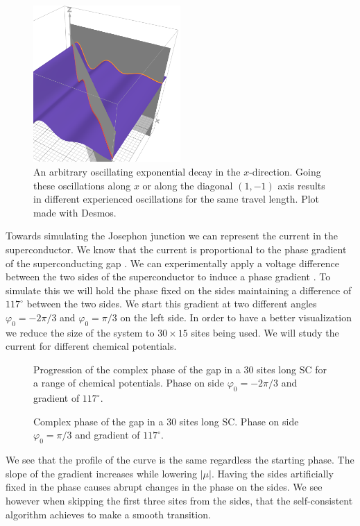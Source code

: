 \documentclass[..\main.tex]{subfile}
\begin{document}
\begin{figure}[H]
  \centering
  \includegraphics[width=0.5\textwidth]{Ressources/CooperPairsOrient.PNG}
  \caption{An arbitrary oscillating exponential decay in the $x$-direction. Going these oscillations along $x$ or along the diagonal $(1,-1)$ axis results in different
  experienced oscillations for the same travel length. Plot made with Desmos.}
\end{figure}
Towards simulating the Josephon junction we can represent the current in the superconductor.
We know that the current is proportional to the phase gradient of the superconducting gap \cite{Orlando2003}.
We can experimentally apply a voltage difference between the two sides of the superconductor to induce a phase gradient \cite{Orlando2003}.
To simulate this we will hold the phase fixed on the sides maintaining a difference of $117^{\circ}$ between the two sides.
We start this gradient at two different angles $\varphi_0 = -2\pi/3$ and $\varphi_0 = \pi/3$ on the left side.
In order to have a better visualization we reduce the size of the system to $30\times15$ sites being used.
 We will study the current for different chemical potentials.
\begin{figure}[H]
    
    \caption{Progression of the complex phase of the gap in a 30 sites long SC for a range of chemical potentials.
     Phase on side $\varphi_0 = -2\pi/3$ and gradient of $117^{\circ}$.}
    \label{fig:Phase-2pi3}
\end{figure}
\begin{figure}[H]
    
    \caption{Complex phase of the gap in a 30 sites long SC. Phase on side $\varphi_0 = \pi/3$ and gradient of $117^{\circ}$.}
    \label{fig:Phasepi3}
\end{figure}
We see that the profile of the curve is the same regardless the starting phase. The slope of the gradient increases while lowering $|\mu|$.
Having the sides artificially fixed in the phase causes abrupt changes in the phase on the sides. We see however when skipping the first
three sites from the sides, that the self-consistent algorithm achieves to make a smooth transition.
\end{document}

